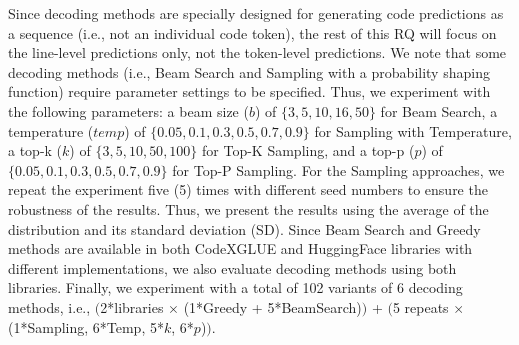 % 
Since decoding methods are specially designed for generating code predictions as a sequence (i.e., not an individual code token), the rest of this RQ will focus on the line-level predictions only, not the token-level predictions.
We note that some decoding methods (i.e., Beam Search and Sampling with a probability shaping function) require parameter settings to be specified.
Thus, we experiment with the following parameters: a beam size ($b$) of $\{3, 5, 10, 16, 50\}$ for Beam Search, a temperature ($temp$) of $\{0.05, 0.1, 0.3, 0.5, 0.7, 0.9\}$ for Sampling with Temperature, a top-k ($k$) of $\{3, 5, 10, 50, 100\}$ for Top-K Sampling, and a top-p ($p$) of $\{0.05,0.1,0.3,0.5,0.7,0.9\}$ for Top-P Sampling.
For the Sampling approaches, we repeat the experiment five (5) times with different seed numbers to ensure the robustness of the results.
Thus, we present the results using the average of the distribution and its standard deviation (SD).
Since Beam Search and Greedy methods are available in both CodeXGLUE and HuggingFace libraries with different implementations, we also evaluate decoding methods using both libraries.
Finally, we experiment with a total of 102 variants of 6 decoding methods, i.e., $\bigl($2*libraries $\times$ (1*Greedy + 5*BeamSearch)$\bigr)$ + $\bigl($5 repeats $\times$ (1*Sampling, 6*Temp, 5*$k$, 6*$p$)$\bigr)$. 

